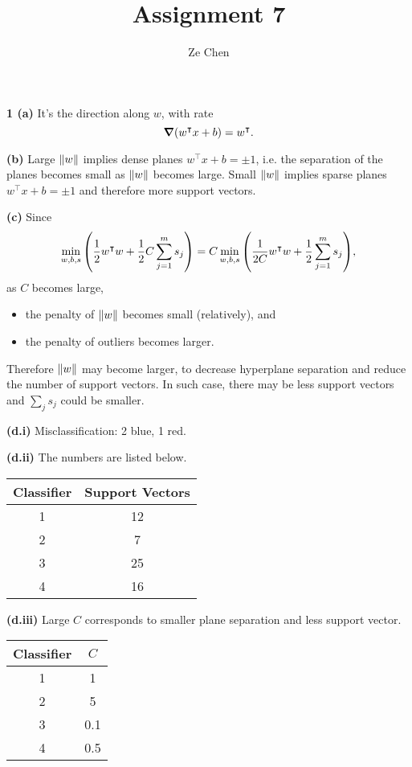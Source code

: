 \documentclass{article}
\title{Assignment 7}
\author{Ze Chen}
\makeatletter
\newcommand*{\shifttext}[1]{%
  \settowidth{\@tempdima}{#1}%
  \hspace{-\@tempdima}#1%
}
\newcommand{\plabel}[1]{%
\shifttext{\textbf{#1}\quad}%
}
\makeatother
\begin{document}
\maketitle

\plabel{1 (a)}%
It's the direction along $w$, with rate
\[ \grad (w^\intercal x + b) = w^\intercal. \]

\plabel{(b)}%
Large $\norm{w}$ implies dense planes $w^\intercal x + b = \pm 1$, i.e. the separation of the planes becomes small as $\norm{w}$ becomes large.
Small $\norm{w}$ implies sparse planes $w^\intercal x + b = \pm 1$ and therefore more support vectors.

\plabel{(c)}%
Since
\[ \min_{w,b,s} \qty(\frac{1}{2} w^\intercal w + \frac{1}{2} C \sum_{j=1}^m s_j) = C \min_{w,b,s} \qty(\frac{1}{2C} w^\intercal w + \frac{1}{2} \sum_{j=1}^m s_j), \]
as $C$ becomes large,
\begin{itemize}
    \item the penalty of $\norm{w}$ becomes small (relatively), and
    \item the penalty of outliers becomes larger.
\end{itemize}
Therefore $\norm{w}$ may become larger, to decrease hyperplane separation and reduce the number of support vectors.
In such case, there may be less support vectors and $\sum_j s_j$ could be smaller.

\plabel{(d.i)}%
Misclassification: 2 blue, 1 red.

\plabel{(d.ii)}%
The numbers are listed below.
\begin{center}
    \begin{tabular}{cc}
        \toprule
        Classifier & Support Vectors \\
        \midrule
        \num{1} & \num{12} \\
        \num{2} & \num{7} \\
        \num{3} & \num{25} \\
        \num{4} & \num{16} \\
        \bottomrule
    \end{tabular}
\end{center}

\plabel{(d.iii)}%
Large $C$ corresponds to smaller plane separation and less support vector.
\begin{center}
    \begin{tabular}{cc}
        \toprule
        Classifier & $C$ \\
        \midrule
        \num{1} & \num{1} \\
        \num{2} & \num{5} \\
        \num{3} & \num{0.1} \\
        \num{4} & \num{0.5} \\
        \bottomrule
    \end{tabular}
\end{center}
\end{document}
